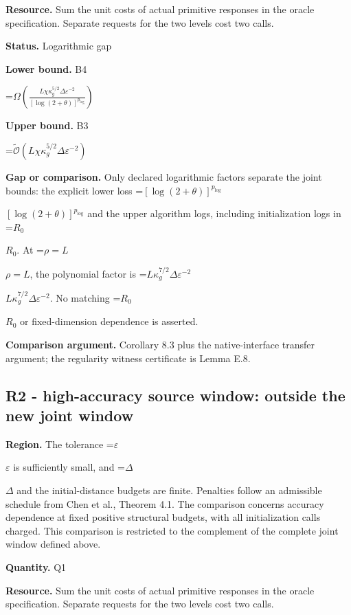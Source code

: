 \documentclass[10pt,a4paper]{article}
\newcommand{\AtlasMath}[1]{\par\begingroup\centering\setbox0=\hbox{$\displaystyle #1$}\ifdim\wd0>1.4\linewidth\typeout{ATLAS WIDE FORMULA: \the\wd0}\fi\ifdim\wd0>\linewidth\resizebox{\linewidth}{!}{\box0}\else\box0\fi\par\endgroup}
\newcommand{\AtlasInlineMath}[1]{\begingroup\setbox0=\hbox{$#1$}\ifdim\wd0>.4\linewidth\endgroup\AtlasMath{#1}\else\endgroup$#1$\fi}
\begin{document}
\textbf{Resource.} Sum the unit costs of actual primitive responses in the oracle specification. Separate requests for the two levels cost two calls.



\textbf{Status.} Logarithmic gap



\textbf{Lower bound.} B4



\AtlasMath{\Omega\!\left(\frac{L\chi\kappa_g^{5/2}\Delta\varepsilon^{-2}}{[\log(2+\theta)]^{p_{\log}}}\right)}


\textbf{Upper bound.} B3



\AtlasMath{\widetilde{\mathcal O}\!\left(L\chi\kappa_g^{5/2}\Delta\varepsilon^{-2}\right)}


\textbf{Gap or comparison.} Only declared logarithmic factors separate the joint bounds: the explicit lower loss \AtlasInlineMath{[\log(2+\theta)]^{p_{\log}}} and the upper algorithm logs, including initialization logs in \AtlasInlineMath{R_0}. At \AtlasInlineMath{\rho=L}, the polynomial factor is \AtlasInlineMath{L\kappa_g^{7/2}\Delta\varepsilon^{-2}}. No matching \AtlasInlineMath{R_0} or fixed-dimension dependence is asserted.



\textbf{Comparison argument.} Corollary 8.3 plus the native-interface transfer argument; the regularity witness certificate is Lemma E.8.



\subsection{R2 - high-accuracy source window: outside the new joint window}


\textbf{Region.} The tolerance \AtlasInlineMath{\varepsilon} is sufficiently small, and \AtlasInlineMath{\Delta} and the initial-distance budgets are finite. Penalties follow an admissible schedule from Chen et al., Theorem 4.1. The comparison concerns accuracy dependence at fixed positive structural budgets, with all initialization calls charged. This comparison is restricted to the complement of the complete joint window defined above.



\textbf{Quantity.} Q1



\textbf{Resource.} Sum the unit costs of actual primitive responses in the oracle specification. Separate requests for the two levels cost two calls.
\end{document}
